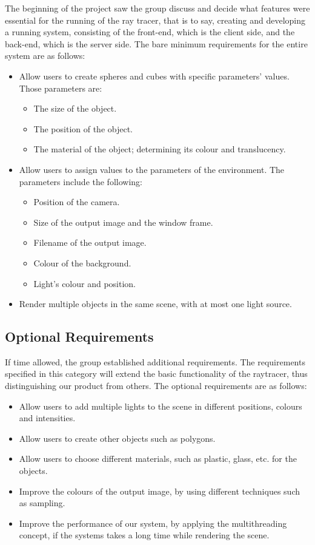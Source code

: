 \documentclass{article}
\begin{document}
	
	The beginning of the project saw the group discuss and decide what features were essential for the running of the ray tracer, that is to say, creating and developing a running system, consisting of the front-end, which is the client side, and the back-end, which is the server side. The bare minimum requirements for the entire system are as follows:
	\begin{itemize}
		\item Allow users to create spheres and cubes with specific parameters' values. Those parameters are:
		\begin{itemize}
			\item The size of the object.
			\item The position of the object.
			\item The material of the object; determining its colour and translucency.
		\end{itemize}
		\item Allow users to assign values to the parameters of the environment. The parameters include the following:
		\begin{itemize}
			\item Position of the camera.
			\item Size of the output image and the window frame.
			\item Filename of the output image.
			\item Colour of the background.
			\item Light's colour and position.
		\end{itemize}
		\item Render multiple objects in the same scene, with at most one light source.
	\end{itemize}
	
	
	\subsection{Optional Requirements}
	
	If time allowed, the group established additional requirements.
	The requirements specified in this category will extend the basic functionality of the raytracer, thus distinguishing our product from others. The optional requirements are as follows:
	\begin{itemize}
		\item Allow users to add multiple lights to the scene in different positions, colours and intensities.
		\item Allow users to create other objects such as polygons.
		\item Allow users to choose different materials, such as plastic, glass, etc. for the objects.
		\item Improve the colours of the output image, by using different techniques such as sampling.
		\item Improve the performance of our system, by applying the multithreading concept, if the systems takes a long time while rendering the scene.
	\end{itemize}
	
\end{document}
